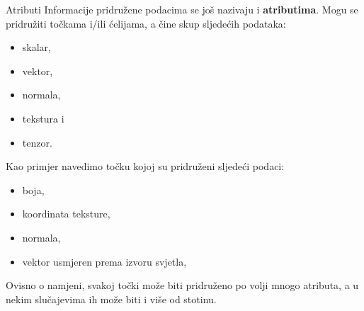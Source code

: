 \documentclass[9pt]{beamer}
\begin{document}
\begin{frame}{Atributi}
	Informacije pridružene podacima se još nazivaju i \textbf{atributima}.
	Mogu se pridružiti točkama i/ili ćelijama, a čine skup sljedećih podataka:
	\begin{itemize}
		\item skalar,
		\item vektor,
		\item normala,
		\item tekstura i 
		\item tenzor.
	\end{itemize}
	Kao primjer navedimo točku kojoj su pridruženi sljedeći podaci:
	\begin{itemize}
		\item boja,
		\item koordinata teksture,
		\item normala,
		\item vektor usmjeren prema izvoru svjetla,
	\end{itemize}
	Ovisno o namjeni, svakoj točki može biti pridruženo po volji mnogo atributa, a u nekim slučajevima ih može biti i više od stotinu.
\end{frame}
\end{document}
